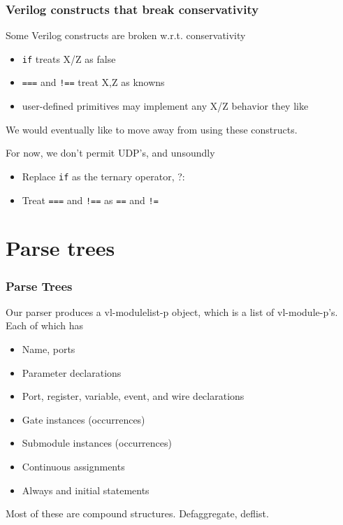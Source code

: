 \documentclass[mathserif]{beamer}
\newcommand{\Highlight}[1]{{\color{Highlight}#1}}
\begin{document}
\begin{frame}
\frametitle{Verilog constructs that break conservativity}

Some Verilog constructs are broken w.r.t. conservativity
\begin{itemize}
\item {\tt if} treats X/Z as false
\item {\tt ===} and {\tt !==} treat X,Z as knowns
\item user-defined primitives may implement any X/Z behavior they like
\end{itemize}

\bigskip

We would eventually like to move away from using these constructs.

\bigskip
For now, we don't permit UDP's, and unsoundly
\begin{itemize}
\item Replace {\tt if} as the ternary operator, ?:
\item Treat {\tt ===} and {\tt !==} as {\tt ==} and {\tt !=}
\end{itemize}



\end{frame}



\section[Parse trees]{Parse trees}

\begin{frame}
\frametitle{Parse Trees}

Our parser produces a \Highlight{vl-modulelist-p} object, which is a list of
\Highlight{vl-module-p}'s.  Each of which has
\begin{itemize}
\item Name, ports
\item Parameter declarations
\item Port, register, variable, event, and wire declarations
\item Gate instances (occurrences)
\item Submodule instances (occurrences)
\item Continuous assignments
\item Always and initial statements
\end{itemize}

\bigskip
Most of these are compound structures.  Defaggregate, deflist.
\end{frame}
\end{document}
